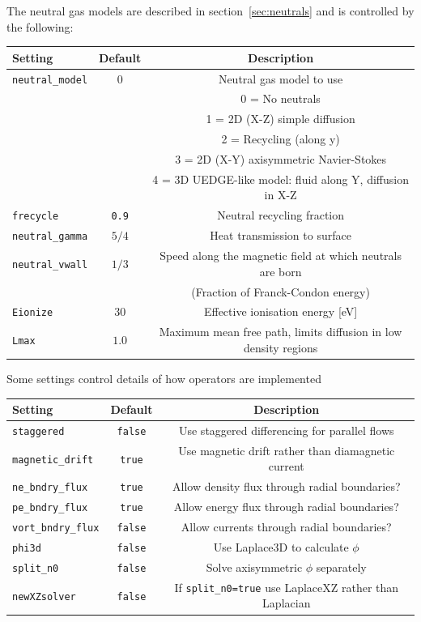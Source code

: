 \documentclass[12pt,a4paper]{article}
\begin{document}
The neutral gas models are described in section~\ref{sec:neutrals} and is controlled by the following:
\begin{center}
\begin{tabular}{l c c}
  Setting & Default & Description \\
  \hline
  \texttt{neutral\_model} & $0$ & Neutral gas model to use \\
  & & 0 = No neutrals \\
  & & 1 = 2D (X-Z) simple diffusion \\
  & & 2 = Recycling (along y) \\
  & & 3 = 2D (X-Y) axisymmetric Navier-Stokes \\
  & & 4 = 3D UEDGE-like model: fluid along Y, diffusion in X-Z \\
  \texttt{frecycle} & \texttt{0.9} & Neutral recycling fraction \\
  \texttt{neutral\_gamma} & $5/4$ & Heat transmission to surface \\
  \texttt{neutral\_vwall} & $1/3$ & Speed along the magnetic field at which neutrals are born \\
  & & (Fraction of Franck-Condon energy) \\
  \texttt{Eionize} & $30$ & Effective ionisation energy [eV] \\
  \texttt{Lmax} & $1.0$ & Maximum mean free path, limits diffusion in low density regions \\
  \hline
\end{tabular}
\end{center}


Some settings control details of how operators are implemented
\begin{center}
\begin{tabular}{l c c}
  Setting & Default & Description \\
  \hline
  \texttt{staggered} & \texttt{false} & Use staggered differencing for parallel flows \\
  \texttt{magnetic\_drift} & \texttt{true} & Use magnetic drift rather than diamagnetic current \\
  \texttt{ne\_bndry\_flux} & \texttt{true} & Allow density flux through radial boundaries? \\
  \texttt{pe\_bndry\_flux} & \texttt{true} & Allow energy flux through radial boundaries? \\
  \texttt{vort\_bndry\_flux} & \texttt{false} & Allow currents through radial boundaries? \\
  \texttt{phi3d} & \texttt{false} & Use Laplace3D to calculate $\phi$ \\
  \texttt{split\_n0} & \texttt{false} & Solve axisymmetric $\phi$ separately \\
  \texttt{newXZsolver} & \texttt{false} & If \texttt{split\_n0=true} use LaplaceXZ rather than Laplacian  \\
  \hline
\end{tabular}
\end{center}
\end{document}
